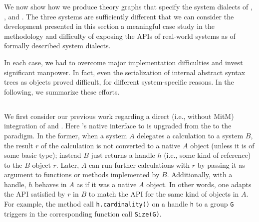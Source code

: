 We now show how we produce \OMMT theory graphs that specify the system dialects of \GAP, \Singular, and \Sage.
The three systems are sufficiently different that we can consider the development presented in this section a meaningful case study in the methodology and difficulty of exposing the APIs of real-world systems as of formally described system dialects.

In each case, we had to overcome major implementation difficulties and invest significant manpower.
In fact, even the serialization of internal abstract syntax trees as \OMMT objects proved difficult, for different system-specific reasons.
In the following, we summarize these efforts.

\subsection{\Sage}

We first consider our previous work \cite{DehKohKon:iop16} regarding a direct (i.e., without MitM) integration of \Sage and \GAP.
Here \Sage's native interface to \GAP is upgraded from the  to the  paradigm.
In the former, when a system $A$ delegates a calculation to a system $B$, the result $r$ of the calculation is not converted to a native $A$ object (unless it is of some basic type); instead $B$ just returns a handle $h$ (i.e., some kind of reference) to the $B$-object $r$.
Later, $A$ can run further calculations with $r$ by passing it as argument to functions or methods implemented by $B$.
Additionally, with a  handle, $h$ behaves in $A$ as if it was a native $A$ object.
In other words, one adapts the API satisfied by $r$ in $B$ to match the API for the same kind of objects in $A$.
For example, the method call \texttt{h.cardinality()} on a \Sage handle \texttt{h} to a \GAP group \texttt{G} triggers in \GAP the corresponding function call \texttt{Size(G)}. 


